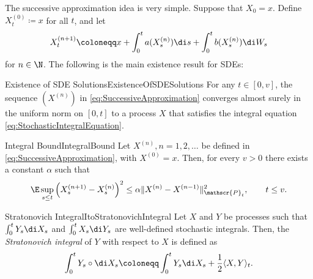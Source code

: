 The successive approximation idea is very simple. Suppose that \(X_0 = x\). Define \(X_t^{(0)} \coloneqq x\) for all \(t\), and let
\begin{equation}
	X_t^{(n+1)} \coloneqq x + \int_0^t a(X_s^{(n)}) \di s + \int_0^t b(X_s^{(n)}) \di W_s
	\label{eq:SuccessiveApproximation}
\end{equation}
for \(n \in \N\). The following is the main existence result for SDEs:

\begin{thm}{Existence of SDE Solutions}{ExistenceOfSDESolutions}
	For any \(t \in [0, v]\), the sequence \((X^{(n)})\) in \eqref{eq:SuccessiveApproximation} converges almost surely in the uniform norm on \([0, t]\) to a process \(X\) that satisfies the integral equation \eqref{eq:StochasticIntegralEquation}.
\end{thm}

\begin{lem}{Integral Bound}{IntegralBound}
	Let \(X^{(n)}, n = 1, 2, \dots\) be defined in \eqref{eq:SuccessiveApproximation}, with \(X^{(0)} = x\). Then, for every \(v > 0\) there exists a constant \(\alpha\) such that
	\begin{equation*}
		\E \sup_{s \le t} \left( X_s^{(n+1)} - X_s^{(n)} \right)^2 \le \alpha \| X^{(n)} - X^{(n-1)} \|_{\mathscr{P}_t}^2, \qquad t \le v.
	\end{equation*}
\end{lem}

\begin{defn}{\Ito{} Stratonovich Integral}{ItoStratonovichIntegral}
	Let \(X\) and \(Y\) be \Ito{} processes such that \(\int_0^t Y_s \di X_s\) and \(\int_0^t X_s \di Y_s\) are well-defined stochastic integrals. Then, the \textit{\Ito{} Stratonovich integral} of \(Y\) with respect to \(X\) is defined as
	\begin{equation}
		\int_0^t Y_s \circ \di X_s \coloneqq \int_0^t Y_s \di X_s + \frac{1}{2}\langle X, Y \rangle_t.
		\label{eq:ItoStratonovichIntegral}
	\end{equation}
\end{defn}


